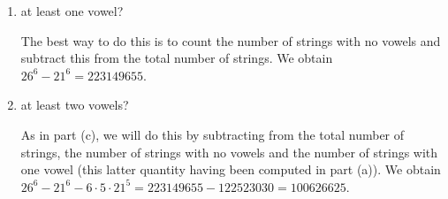\documentclass[11pt]{article}
\begin{document}
\begin{enumerate}[label=\textbf{\arabic*.}]
\begin{enumerate}[label=\textbf{\alph*)}]
		\item at least one vowel?
		
		The best way to do this is to count the number of strings with no vowels and subtract this from the total number of strings. We obtain $26^6 - 21^6 = 223149655$.
		
		\item at least two vowels?
		
		As in part (c), we will do this by subtracting from the total number of strings, the number of strings with no vowels and the number of strings with one vowel (this latter quantity having been computed in part (a)). We obtain $26^6 - 21^6 - 6 \cdot 5 \cdot 21^5 = 223149655 - 122523030 = 100626625$.
	\end{enumerate}
\end{enumerate}
\end{document}
